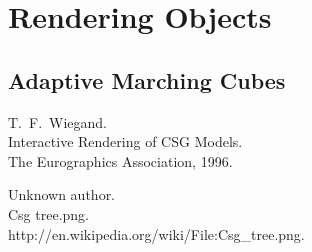 \documentclass[a4paper,10pt,twoside]{report}
\begin{document}
\chapter{Rendering Objects}
\section{Adaptive Marching Cubes}

\begin{thebibliography}{99}
    T.~F.~Wiegand.\\
    Interactive Rendering of CSG Models.\\
    The Eurographics Association, 1996.
    
    Unknown author.\\
    Csg tree.png.\\
    http://en.wikipedia.org/wiki/File:Csg\_tree.png.\\
\end{thebibliography}
\end{document}
